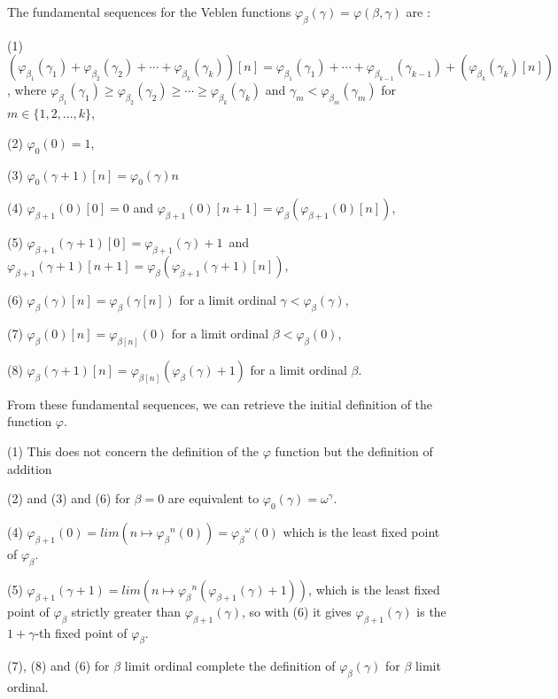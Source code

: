 \documentclass[10pt]{article}
\begin{document}
The fundamental sequences for the Veblen functions \(\varphi_\beta(\gamma) = \varphi(\beta,\gamma) \) are :

\bigskip

(1) \((\varphi_{\beta_1}(\gamma_1) + \varphi_{\beta_2}(\gamma_2) + \cdots + \varphi_{\beta_k}(\gamma_k))[n]=\varphi_{\beta_1}(\gamma_1) + \cdots + \varphi_{\beta_{k-1}}(\gamma_{k-1}) + (\varphi_{\beta_k}(\gamma_k) [n])\), where \(\varphi_{\beta_1}(\gamma_1) \ge \varphi_{\beta_2}(\gamma_2) \ge \cdots \ge \varphi_{\beta_k}(\gamma_k)\) and \(\gamma_m < \varphi_{\beta_m}(\gamma_m)\) for \(m \in \{1,2,...,k\}\),

(2) \(\varphi_0(0) = 1\),

(3) \(\varphi_0(\gamma+1) [n] = \varphi_0(\gamma) n\)

(4) \(\varphi_{\beta+1}(0) [0] = 0 \) and \(\varphi_{\beta+1}(0) [n+1] = \varphi_{\beta}(\varphi_{\beta+1}(0) [n]) \),

(5) \(\varphi_{\beta+1}(\gamma+1) [0] = \varphi_{\beta+1}(\gamma)+1 \,\) and \(\varphi_{\beta+1}(\gamma+1) [n+1] = \varphi_{\beta} (\varphi_{\beta+1}(\gamma+1) [n]) \),

(6) \(\varphi_{\beta}(\gamma) [n] = \varphi_{\beta}(\gamma [n])\) for a limit ordinal \(\gamma<\varphi_\beta(\gamma)\),

(7) \(\varphi_{\beta}(0) [n] = \varphi_{\beta [n]}(0)\) for a limit ordinal \(\beta<\varphi_\beta(0)\),

(8) \(\varphi_{\beta}(\gamma+1) [n] = \varphi_{\beta [n]}(\varphi_{\beta}(\gamma)+1)\) for a limit ordinal \(\beta\).

\bigskip

From these fundamental sequences, we can retrieve the initial definition of the function \( \varphi \).

\bigskip

(1) This does not concern the definition of the \( \varphi \) function but the definition of addition

(2) and (3) and (6) for \( \beta = 0 \) are equivalent to \( \varphi_0(\gamma) = \omega^\gamma \).

(4) \( \varphi_{\beta+1}(0) = lim (n \mapsto {\varphi_\beta}^n(0)) = {\varphi_\beta}^\omega(0) \) which is the least fixed point of \( \varphi_\beta \).

(5) \( \varphi_{\beta+1}(\gamma+1) = lim (n \mapsto {\varphi_\beta}^n (\varphi_{\beta+1}(\gamma)+1)) \), which is the least fixed point of \( \varphi_\beta \) strictly greater than \( \varphi_{\beta+1}(\gamma) \), so with (6) it gives \( \varphi_{\beta+1}(\gamma) \) is the \(1+\gamma\)-th fixed point of \( \varphi_\beta \).

(7), (8) and (6) for \( \beta \) limit ordinal complete the definition of \( \varphi_\beta(\gamma) \) for \( \beta \) limit ordinal.
\end{document}
